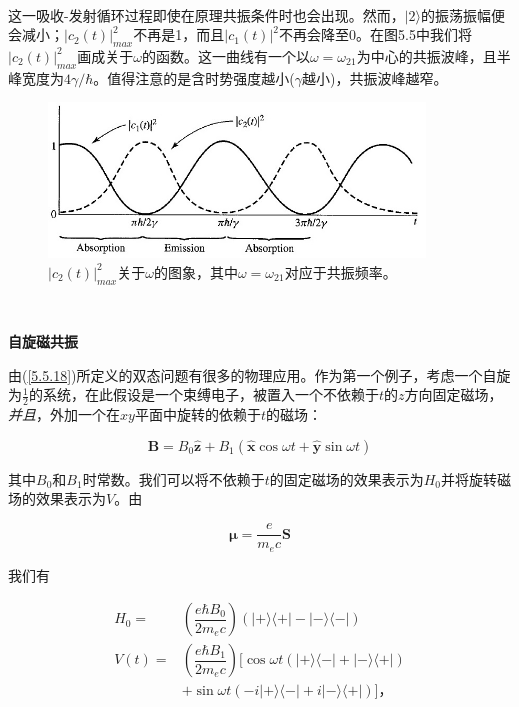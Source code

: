 ﻿\documentclass[UTF8,twoside]{ctexart}
\begin{document}
\

\noindent 这一吸收-发射循环过程即使在原理共振条件时也会出现。然而，$|2\rangle$的振荡振幅便会减小；$|c_2(t)|_{max}^2$不再是1，而且$|c_1(t)|^2$不再会降至0。在图5.5中我们将$|c_2(t)|_{max}^2$画成关于$\omega$的函数。这一曲线有一个以$\omega=\omega_{21}$为中心的共振波峰，且半峰宽度为$4\gamma/\hbar$。值得注意的是含时势强度越小($\gamma$越小)，共振波峰越窄。

\begin{figure}
\begin{centering}
\includegraphics[width = 10cm]{./Graph/5.4.jpg}
\caption{$|c_2(t)|_{max}^2$关于$\omega$的图象，其中$\omega=\omega_{21}$对应于共振频率。}
\label {Figure 5.5}
\end{centering}
\end{figure}

\

\noindent \textbf{自旋磁共振}

\noindent 由(\ref{5.5.18})所定义的双态问题有很多的物理应用。作为第一个例子，考虑一个自旋为$\frac{1}{2}$的系统，在此假设是一个束缚电子，被置入一个不依赖于\emph{$t$}的$z$方向固定磁场，\emph{并且}，外加一个在$xy$平面中旋转的依赖于\emph{$t$}的磁场：

\begin{equation} \label{5.5.26}
\boldsymbol{B}=B_0\hat{\boldsymbol{z}}+B_1(\hat{\boldsymbol{x}}\cos\omega t+\hat{\boldsymbol{y}}\sin\omega t)
\end{equation}

\noindent 其中$B_0$和$B_1$时常数。我们可以将不依赖于\emph{$t$}的固定磁场的效果表示为$H_0$并将旋转磁场的效果表示为$V$。由

\begin{equation} \label{5.5.27}
\boldsymbol{\mu}=\dfrac{e}{m_e c}\boldsymbol{S}
\end{equation}

\noindent 我们有

\begin{equation} \label{5.5.28}
\begin{split}
H_0=&\left(\dfrac{e\hbar B_0}{2m_e c}\right)(|+\rangle\langle+|-|-\rangle\langle-|)\\
V(t)=&\left(\dfrac{e\hbar B_1}{2m_e c}\right)[\cos\omega t(|+\rangle\langle-|+|-\rangle\langle+|)\\
&+\sin\omega t(-i|+\rangle\langle-|+i|-\rangle\langle+|)]\text{，}
\end{split}
\end{equation}
\end{document}
